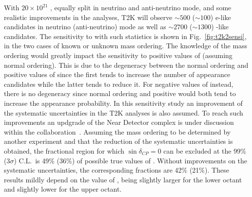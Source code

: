With $20\times10^{21}$ \pot, equally split in neutrino and anti-neutrino mode, and some realistic improvements in the analyses, T2K will observe $\sim500$ ($\sim100$) e-like candidates in neutrino (anti-neutrino) mode as well as $\sim2700$ ($\sim1300$) \mmu-like candidates. The sensitivity to \dcp with such statistics is shown in Fig.~\ref{fig:t2k2sensi}, in the two cases of known or unknown mass ordering. The knowledge of the mass ordering would greatly impact the sensitivity to positive values of \dcp (assuming normal ordering). This is due to the degeneracy between the normal ordering and positive values of \dcp since the first tends to increase the number of \nue appearance candidates while the latter tends to reduce it. For negative values of \dcp instead, there is no degeneracy since normal ordering and positive \dcp would both tend to increase the \nue appearance probability. In this sensitivity study an improvement of the systematic uncertainties in the T2K analyses is also assumed. To reach such improvements an updgrade of the Near Detector complex is under discussion within the collaboration~\cite{ndupgrade}. Assuming the mass ordering to be determined by another experiment and that the reduction of the systematic uncertainties is obtained, the fractional region for which \(\sin\delta_{CP}=0\) can be excluded at the 99\% (3\(\sigma\)) C.L.\ is 49\% (36\%) of possible true values of \dcp. Without improvements on the systematic uncertainties, the corresponding fractions are 42$\%$ (21$\%$). These results mildly depend on the value of \stt, being slightly larger for the lower octant and slightly lower for the upper octant.

